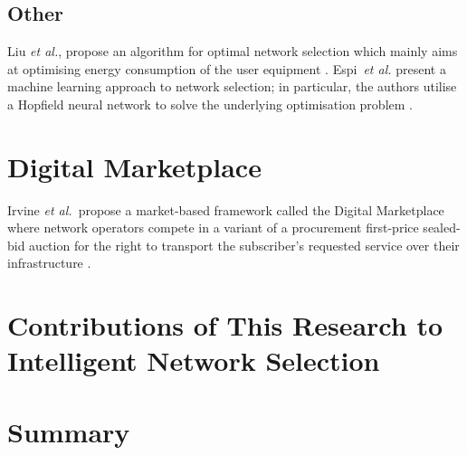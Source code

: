 
\subsection{Other} %
\label{sub:other_intelligent}
 Liu \emph{et al.}, propose an algorithm for optimal network selection which mainly aims at optimising energy consumption of the user equipment \cite{Liu2009}. Espi~\emph{et al.} present a machine learning approach to network selection; in particular, the authors utilise a Hopfield neural network to solve the underlying optimisation problem \cite{Espi10}.

\section{Digital Marketplace} %
\label{sec:digital_marketplace_intelligent}
Irvine \emph{et al.}~propose a market-based framework called the Digital Marketplace where network operators compete in a variant of a procurement first-price sealed-bid auction for the right to transport the subscriber's requested service over their infrastructure \cite{DMLeBodic00, DMIrvine01, DMIrvine02}.

\section{Contributions of This Research to Intelligent Network Selection} %
\label{sec:contributions_of_this_research_to_intelligent_network_selection_intelligent}


\section{Summary} %
\label{sec:summary_intelligent}

